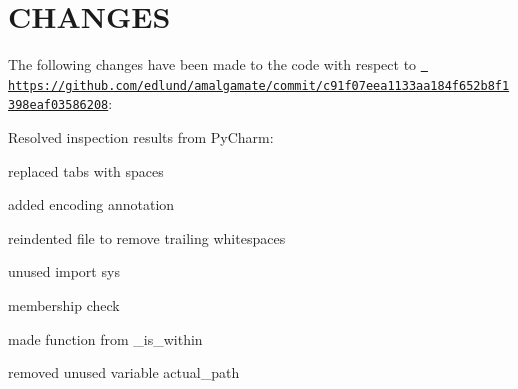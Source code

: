 \chapter{CHANGES}
\hypertarget{md_build_2dt__core_2__deps_2nlohmann__json-src_2tools_2amalgamate_2CHANGES}{}\label{md_build_2dt__core_2__deps_2nlohmann__json-src_2tools_2amalgamate_2CHANGES}
The following changes have been made to the code with respect to \href{https://github.com/edlund/amalgamate/commit/c91f07eea1133aa184f652b8f1398eaf03586208}{\texttt{ https\+://github.\+com/edlund/amalgamate/commit/c91f07eea1133aa184f652b8f1398eaf03586208}}\+:


\begin{DoxyItemize}
\item Resolved inspection results from Py\+Charm\+:
\begin{DoxyItemize}
\item replaced tabs with spaces
\item added encoding annotation
\item reindented file to remove trailing whitespaces
\item unused import {\ttfamily sys}
\item membership check
\item made function from {\ttfamily \+\_\+is\+\_\+within}
\item removed unused variable {\ttfamily actual\+\_\+path} 
\end{DoxyItemize}
\end{DoxyItemize}
